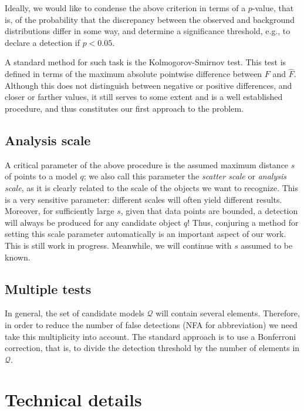\documentclass[a4page,11pt]{article}
\newcommand{\set}[1]{\mathcal{#1}}%
\begin{document}
Ideally, we would like to condense the above criterion in terms of a $p$-value, that is, of the probability that the discrepancy between the observed and background distributions differ in some way, and determine a significance threshold, e.g., to declare a detection if $p < 0.05$.

A standard method for such task is the Kolmogorov-Smirnov test. This test is defined in terms of the maximum absolute pointwise difference between $F$ and $\hat{F}$. Although this does not distinguish between negative or positive differences, and closer or farther values, it still serves to some extent and is a well established procedure, and thus constitutes our first approach to the problem.



\subsection{Analysis scale}

A critical parameter of the above procedure is the assumed maximum distance $s$ of points to a model $q$; we also call this parameter the \emph{scatter scale} or \emph{analysis scale}, as it is clearly related to the scale of the objects we want to recognize. This is a very sensitive parameter: different scales will often yield different results. Moreover, for sufficiently large $s$, given that data points are bounded, a detection will always be produced for any candidate object $q$! Thus, conjuring a method for setting this scale parameter automatically is an important aspect of our work. This is still work in progress. Meanwhile, we will continue with $s$ assumed to be known.

\subsection{Multiple tests}

In general, the set of candidate models $\set{Q}$ will contain several elements. Therefore, in order to reduce the number of false detections (NFA for abbreviation)  we need take this multiplicity into account. The standard approach is to use a Bonferroni correction, that is, to divide the detection threshold by the number of elements in $\set{Q}$.

\section{Technical details}
\end{document}
